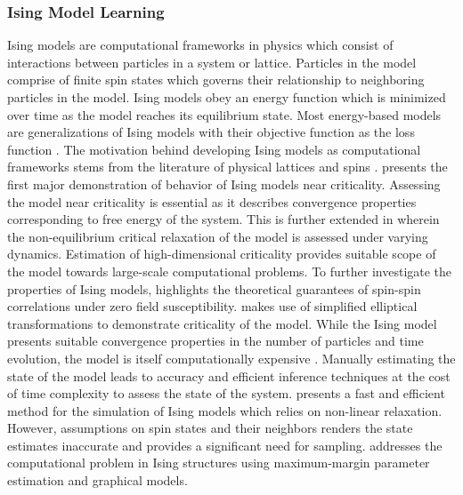 \documentclass{article}
\begin{document}
\subsubsection{Ising Model Learning}
Ising models \cite{intro} are computational frameworks in physics which consist of interactions between particles in a system or lattice. Particles in the model comprise of finite spin states \cite{spin} which governs their relationship to neighboring particles in the model. Ising models obey an energy function \cite{intro} which is minimized over time as the model reaches its equilibrium state. Most energy-based models are generalizations of Ising models with their objective function as the loss function \cite{ising-energy}. The motivation behind developing Ising models as computational frameworks stems from the literature of physical lattices and spins \cite{intro,spin,ising-energy,scaling}. \cite{scaling} presents the first major demonstration of behavior of Ising models near criticality. Assessing the model near criticality is essential as it describes convergence properties corresponding to free energy of the system. This is further extended in \cite{ising-energy} wherein the non-equilibrium critical relaxation of the model is assessed under varying dynamics. Estimation of high-dimensional criticality provides suitable scope of the model towards large-scale computational problems. To further investigate the properties of Ising models, \cite{field} highlights the theoretical guarantees of spin-spin correlations under zero field susceptibility. \cite{field} makes use of simplified elliptical transformations to demonstrate criticality of the model. While the Ising model presents suitable convergence properties \cite{convergence} in the number of particles and time evolution, the model is itself computationally expensive \cite{fast}. Manually estimating the state of the model leads to accuracy and efficient inference techniques at the cost of time complexity to assess the state of the system. \cite{fast} presents a fast and efficient method for the simulation of Ising models which relies on non-linear relaxation. However, assumptions on spin states and their neighbors renders the state estimates inaccurate and provides a significant need for sampling. \cite{exact} addresses the computational problem in Ising structures using maximum-margin parameter estimation and graphical models. \\
\end{document}

